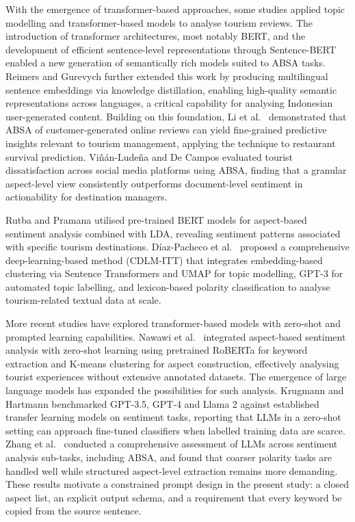 \documentclass[pdflatex,sn-mathphys-num]{sn-jnl}
\begin{document}
With the emergence of transformer-based approaches, some studies applied topic modelling and transformer-based models to analyse tourism reviews. The introduction of transformer architectures, most notably BERT, and the development of efficient sentence-level representations through Sentence-BERT \cite{bib12} enabled a new generation of semantically rich models suited to ABSA tasks. Reimers and Gurevych \cite{bib13} further extended this work by producing multilingual sentence embeddings via knowledge distillation, enabling high-quality semantic representations across languages, a critical capability for analysing Indonesian user-generated content. Building on this foundation, Li et al.\ \cite{bib14} demonstrated that ABSA of customer-generated online reviews can yield fine-grained predictive insights relevant to tourism management, applying the technique to restaurant survival prediction. Vi\~n\'an-Lude\~na and De Campos \cite{bib15} evaluated tourist dissatisfaction across social media platforms using ABSA, finding that a granular aspect-level view consistently outperforms document-level sentiment in actionability for destination managers.

Rutba and Pramana \cite{bib16} utilised pre-trained BERT models for aspect-based sentiment analysis combined with LDA, revealing sentiment patterns associated with specific tourism destinations. D\'iaz-Pacheco et al.\ \cite{bib17} proposed a comprehensive deep-learning-based method (CDLM-ITT) that integrates embedding-based clustering via Sentence Transformers and UMAP for topic modelling, GPT-3 for automated topic labelling, and lexicon-based polarity classification to analyse tourism-related textual data at scale.

More recent studies have explored transformer-based models with zero-shot and prompted learning capabilities. Nawawi et al.\ \cite{bib5} integrated aspect-based sentiment analysis with zero-shot learning using pretrained RoBERTa for keyword extraction and K-means clustering for aspect construction, effectively analysing tourist experiences without extensive annotated datasets. The emergence of large language models has expanded the possibilities for such analysis. Krugmann and Hartmann \cite{bib18} benchmarked GPT-3.5, GPT-4 and Llama 2 against established transfer learning models on sentiment tasks, reporting that LLMs in a zero-shot setting can approach fine-tuned classifiers when labelled training data are scarce. Zhang et al.\ \cite{bib19} conducted a comprehensive assessment of LLMs across sentiment analysis sub-tasks, including ABSA, and found that coarser polarity tasks are handled well while structured aspect-level extraction remains more demanding. These results motivate a constrained prompt design in the present study: a closed aspect list, an explicit output schema, and a requirement that every keyword be copied from the source sentence.
\end{document}
